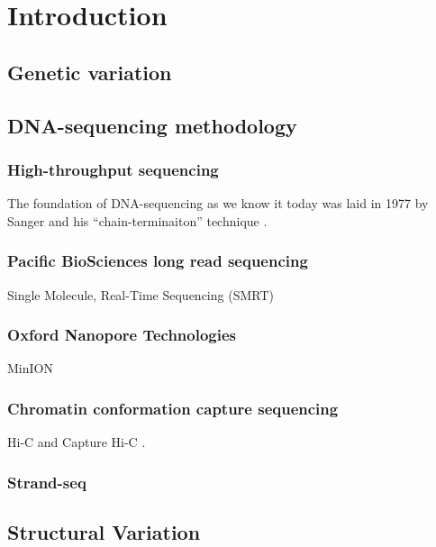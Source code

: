 \chapter{Introduction}

\section{Genetic variation}
\label{sec:variation}

\section{DNA-sequencing methodology}


\subsection{High-throughput sequencing}
\label{sec:hts}

The foundation of DNA-sequencing as we know it today was laid in 1977 by
Sanger and his ``chain-terminaiton'' technique \citep{Sanger1977}.


\subsection{Pacific BioSciences\textsuperscript{\textregistered} long read sequencing}
\label{sec:pacbio}
Single Molecule, Real-Time Sequencing (SMRT\textsuperscript{\textregistered})

\subsection{Oxford Nanopore Technologies\textsuperscript{\textregistered}}
\label{sec:ont}
MinION\textregistered

\subsection{Chromatin conformation capture sequencing}
\label{sec:ccc}

Hi-C \citep{Lieberman-Aiden2009} and Capture Hi-C \citep{Dryden2014,Schoenfelder2015,Jager2015,Mifsud2015}.

\subsection{Strand-seq}
\label{sec:strandseq}

\section{Structural Variation}
\label{sec:sv}
